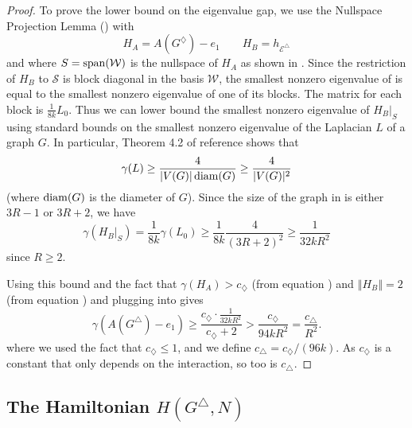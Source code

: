 \documentclass[../thesis-main/thesis-main]{subfiles}
\begin{document}
\begin{proof}
To prove the lower bound on the eigenvalue gap, we use the Nullspace Projection Lemma () with 
\begin{equation}
H_{A}=A(G^{\diamondsuit})-e_{1}\qquad H_{B}=h_{\mathcal{E}^{\triangle}}
\end{equation}
and where $S=\operatorname{span}(\mathcal{W})$ is the nullspace of $H_{A}$ as shown in . Since the restriction of $H_B$ to $\mathcal{S}$ is block diagonal in the basis $\mathcal{W}$, the smallest nonzero eigenvalue of  is equal to the smallest nonzero eigenvalue of one of its blocks. The matrix for each block is $\frac{1}{8k}L_{0}$. Thus we can lower bound the smallest nonzero eigenvalue of $H_B|_S$ using standard bounds on the smallest nonzero eigenvalue of the Laplacian $L$ of a graph $G$. In particular, Theorem 4.2 of reference \cite{Moh91} shows that 
\begin{equation*}
  \gamma(L) \geq \frac{4}{|V(G)| \operatorname{diam}(G)} \geq \frac{4}{|V(G)|^2}
\end{equation*}
(where $\operatorname{diam}(G)$ is the diameter of $G$). Since the size of the graph in  is either $3R-1$ or $3R+2$, we have
\begin{equation*}
  \gamma(H_{B}|_{S})=\frac{1}{8k}\gamma(L_{0}) \geq \frac{1}{8k}\frac{4}{\left(3R+2\right)^{2}}\geq\frac{1}{32kR^{2}}
\end{equation*}
since $R\geq2$. 

Using this bound and the fact that $\gamma(H_{A})>c_{\diamondsuit}$ (from equation ) and $\left\Vert H_{B}\right\Vert =2$ (from equation ) and plugging into  gives
\begin{equation}
  \gamma(A(G^{\triangle})-e_{1})\geq\frac{c_{\diamondsuit}\cdot\frac{1}{32kR^{2}}}{c_{\diamondsuit}+2}>\frac{c_{\diamondsuit}}{94 kR^{2}}=\frac{c_{\triangle}}{R^2}. 
\end{equation}
where we used the fact that $c_{\diamondsuit} \leq 1$, and we define $c_\triangle = c_{\diamondsuit}/(96k)$.  As $c_\diamondsuit$ is a constant that only depends on the interaction, so too is $c_\triangle$.
\end{proof}


\subsection{The Hamiltonian $H(G^{\triangle},N)$}
\end{document}
